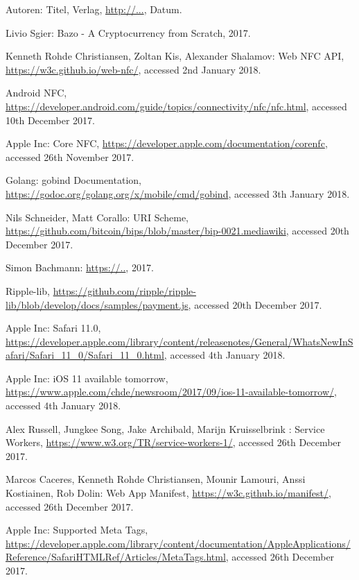 \begin{thebibliography}{99}

 Autoren: Titel, Verlag, \url{http://...}, Datum.

 Livio Sgier: Bazo - A Cryptocurrency from Scratch, 2017.

 Kenneth Rohde Christiansen, Zoltan Kis, Alexander Shalamov: Web NFC API, \url{https://w3c.github.io/web-nfc/}, accessed 2nd January 2018.


 Android NFC, \url{https://developer.android.com/guide/topics/connectivity/nfc/nfc.html}, accessed 10th December 2017.

 Apple Inc: Core NFC, \url{https://developer.apple.com/documentation/corenfc}, accessed 26th November 2017.

 Golang: gobind Documentation, \url{https://godoc.org/golang.org/x/mobile/cmd/gobind}, accessed 3th January 2018.

 Nils Schneider, Matt Corallo: URI Scheme, \url{https://github.com/bitcoin/bips/blob/master/bip-0021.mediawiki}, accessed 20th December 2017.

 Simon Bachmann:  \url{https://..}, 2017.

 Ripple-lib, \url{https://github.com/ripple/ripple-lib/blob/develop/docs/samples/payment.js}, accessed 20th December 2017.

 Apple Inc: Safari 11.0,   \url{https://developer.apple.com/library/content/releasenotes/General/WhatsNewInSafari/Safari_11_0/Safari_11_0.html}, accessed 4th January 2018.

 Apple Inc: iOS 11 available tomorrow,  \url{https://www.apple.com/chde/newsroom/2017/09/ios-11-available-tomorrow/}, accessed 4th January 2018.

 Alex Russell, Jungkee Song, Jake Archibald, Marijn Kruisselbrink : Service Workers, \url{https://www.w3.org/TR/service-workers-1/}, accessed 26th December 2017.

 Marcos Caceres, 
Kenneth Rohde Christiansen, Mounir Lamouri, Anssi Kostiainen, Rob Dolin: Web App Manifest, \url{https://w3c.github.io/manifest/}, accessed 26th December 2017.

 Apple Inc: Supported Meta Tags,  \url{https://developer.apple.com/library/content/documentation/AppleApplications/Reference/SafariHTMLRef/Articles/MetaTags.html}, accessed 26th December 2017.


\end{thebibliography}
